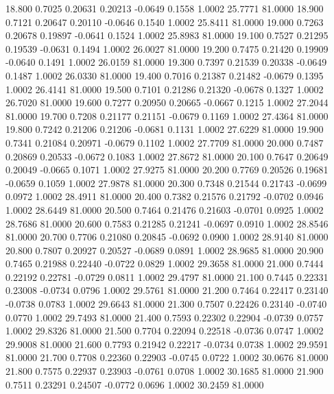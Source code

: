   18.800   0.7025   0.20631   0.20213  -0.0649   0.1558   1.0002  25.7771  81.0000
  18.900   0.7121   0.20647   0.20110  -0.0646   0.1540   1.0002  25.8411  81.0000
  19.000   0.7263   0.20678   0.19897  -0.0641   0.1524   1.0002  25.8983  81.0000
  19.100   0.7527   0.21295   0.19539  -0.0631   0.1494   1.0002  26.0027  81.0000
  19.200   0.7475   0.21420   0.19909  -0.0640   0.1491   1.0002  26.0159  81.0000
  19.300   0.7397   0.21539   0.20338  -0.0649   0.1487   1.0002  26.0330  81.0000
  19.400   0.7016   0.21387   0.21482  -0.0679   0.1395   1.0002  26.4141  81.0000
  19.500   0.7101   0.21286   0.21320  -0.0678   0.1327   1.0002  26.7020  81.0000
  19.600   0.7277   0.20950   0.20665  -0.0667   0.1215   1.0002  27.2044  81.0000
  19.700   0.7208   0.21177   0.21151  -0.0679   0.1169   1.0002  27.4364  81.0000
  19.800   0.7242   0.21206   0.21206  -0.0681   0.1131   1.0002  27.6229  81.0000
  19.900   0.7341   0.21084   0.20971  -0.0679   0.1102   1.0002  27.7709  81.0000
  20.000   0.7487   0.20869   0.20533  -0.0672   0.1083   1.0002  27.8672  81.0000
  20.100   0.7647   0.20649   0.20049  -0.0665   0.1071   1.0002  27.9275  81.0000
  20.200   0.7769   0.20526   0.19681  -0.0659   0.1059   1.0002  27.9878  81.0000
  20.300   0.7348   0.21544   0.21743  -0.0699   0.0972   1.0002  28.4911  81.0000
  20.400   0.7382   0.21576   0.21792  -0.0702   0.0946   1.0002  28.6449  81.0000
  20.500   0.7464   0.21476   0.21603  -0.0701   0.0925   1.0002  28.7686  81.0000
  20.600   0.7583   0.21285   0.21241  -0.0697   0.0910   1.0002  28.8546  81.0000
  20.700   0.7706   0.21080   0.20845  -0.0692   0.0900   1.0002  28.9140  81.0000
  20.800   0.7807   0.20927   0.20527  -0.0689   0.0891   1.0002  28.9685  81.0000
  20.900   0.7465   0.21988   0.22440  -0.0722   0.0829   1.0002  29.3658  81.0000
  21.000   0.7444   0.22192   0.22781  -0.0729   0.0811   1.0002  29.4797  81.0000
  21.100   0.7445   0.22331   0.23008  -0.0734   0.0796   1.0002  29.5761  81.0000
  21.200   0.7464   0.22417   0.23140  -0.0738   0.0783   1.0002  29.6643  81.0000
  21.300   0.7507   0.22426   0.23140  -0.0740   0.0770   1.0002  29.7493  81.0000
  21.400   0.7593   0.22302   0.22904  -0.0739   0.0757   1.0002  29.8326  81.0000
  21.500   0.7704   0.22094   0.22518  -0.0736   0.0747   1.0002  29.9008  81.0000
  21.600   0.7793   0.21942   0.22217  -0.0734   0.0738   1.0002  29.9591  81.0000
  21.700   0.7708   0.22360   0.22903  -0.0745   0.0722   1.0002  30.0676  81.0000
  21.800   0.7575   0.22937   0.23903  -0.0761   0.0708   1.0002  30.1685  81.0000
  21.900   0.7511   0.23291   0.24507  -0.0772   0.0696   1.0002  30.2459  81.0000
